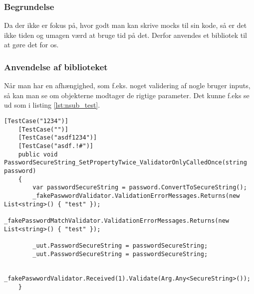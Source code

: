 \documentclass[Implementering/Implementering_main.tex]{subfiles}
\begin{document}
\subsubsection{Begrundelse}
Da der ikke er fokus på, hvor godt man kan skrive mocks til sin kode, så er det ikke tiden og umagen værd at bruge tid på det. Derfor anvendes et bibliotek til at gøre det for os.
\subsubsection{Anvendelse af biblioteket}
Når man har en afhængighed, som f.eks. noget validering af nogle bruger inputs, så kan man se om objekterne modtager de rigtige parameter. Det kunne f.eks se ud som i listing  \ref{lst:nsub_test}.
\begin{lstlisting}[caption={Oprettelse af en side med tilhørende ViewModel}, label={lst:nsub_test},style=customc]
    [TestCase("1234")]
    [TestCase("")]
    [TestCase("asdf1234")]
    [TestCase("asdf.!#")]
    public void PasswordSecureString_SetPropertyTwice_ValidatorOnlyCalledOnce(string password)
    {
        var passwordSecureString = password.ConvertToSecureString();
        _fakePaswwordValidator.ValidationErrorMessages.Returns(new List<string>() { "test" });
        _fakePasswordMatchValidator.ValidationErrorMessages.Returns(new List<string>() { "test" });

        _uut.PasswordSecureString = passwordSecureString;
        _uut.PasswordSecureString = passwordSecureString;

        _fakePaswwordValidator.Received(1).Validate(Arg.Any<SecureString>());
    }
\end{lstlisting}
\end{document}
